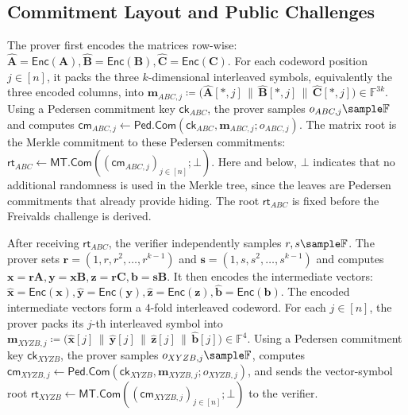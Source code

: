 \documentclass[conference,compsoc]{IEEEtran}
\newcommand{\cm}{\textsf{cm}}
\newcommand{\rt}{\textsf{rt}}
\newcommand{\merkleC}{\textsf{MT.Com}}
\newcommand{\ck}{\textsf{ck}}
\newcommand{\pedC}{\textsf{Ped.Com}}
\newcommand{\mat}{\mathbf}          %
\newcommand{\vect}{\mathbf}         %
\renewcommand{\enc}{\mathsf{Enc}}   %
\renewcommand{\ck}{{\textsf{ck}}}
\theoremstyle{plain}
\theoremstyle{definition}
\theoremstyle{remark}
\providecommand{\DIFaddtex}[1]{{\protect\color{DIFADD} \sf #1}} %
\providecommand{\DIFaddbegin}{} %
\providecommand{\DIFaddend}{} %
\providecommand{\DIFadd}[1]{\texorpdfstring{\DIFaddtex{#1}}{#1}} %
\providecommand{\DIFaddincludegraphics}[2][]{{\color{blue}\fbox{\DIFOincludegraphics[#1]{#2}}}} %
\DeclareRobustCommand{\DIFaddbegin}{\DIFOaddbegin \let\includegraphics\DIFaddincludegraphics} %
\DeclareRobustCommand{\DIFaddend}{\DIFOaddend \let\includegraphics\DIFOincludegraphics} %
\begin{document}
\subsection{Commitment Layout and Public Challenges}
\label{sec:commitment-challenge}

The prover first encodes the matrices row-wise:
{\footnotesize
\(\widehat{\mat{A}}=\enc(\mat{A}),
  \widehat{\mat{B}}=\enc(\mat{B}),
  \widehat{\mat{C}}=\enc(\mat{C})\).
}
For each codeword position \(j\in[n]\), it packs the three \(k\)-dimensional
interleaved symbols, equivalently the three encoded columns, into
{\footnotesize
\(\vect{m}_{ABC,j}
  \coloneqq
  \big(
    \widehat{\mat{A}}[*,j]\,
    \|\,\widehat{\mat{B}}[*,j]\,
    \|\,\widehat{\mat{C}}[*,j]
  \big)
  \in\mathbb{F}^{3k}\).
}
Using a Pedersen commitment key \(\ck_{ABC}\), the prover samples
\(o_{ABC,j}\sample\mathbb{F}\) and computes
{\footnotesize
\(\cm_{ABC,j}
  \gets
  \pedC(\ck_{ABC},\vect{m}_{ABC,j};o_{ABC,j})\).
}
The matrix root is the Merkle commitment to these Pedersen commitments:
{\footnotesize
\(\rt_{ABC}
  \gets
  \merkleC((\cm_{ABC,j})_{j\in[n]};\bot)\).
}
Here and below, \(\bot\) indicates that no additional randomness is used in the
Merkle tree, since the leaves are Pedersen commitments that already provide
hiding. The root \(\rt_{ABC}\) is fixed before the Freivalds challenge is
derived.

After receiving \(\rt_{ABC}\), the verifier  \DIFaddbegin \DIFadd{independently samples
\(r,s\sample\mathbb{F}\)}\DIFaddend .  The prover sets
{\footnotesize
\(\vect{r}=(1,r,r^2,\ldots,r^{k-1})\) \DIFaddbegin \DIFadd{and
\(\vect{s}=(1,s,s^2,\ldots,s^{k-1})\)}\DIFaddend }
and computes
{\footnotesize
 \DIFaddbegin \DIFadd{\(\vect{x}=\vect{r}\mat{A},
  \vect{y}=\vect{x}\mat{B},
  \vect{z}=\vect{r}\mat{C},
  \vect{b}=\vect{s}\mat{B}\)}\DIFaddend .
}
It then encodes the intermediate vectors:
{\footnotesize
 \DIFaddbegin \DIFadd{\(\widehat{\vect{x}}=\enc(\vect{x}),
  \widehat{\vect{y}}=\enc(\vect{y}),
  \widehat{\vect{z}}=\enc(\vect{z}),
  \widehat{\vect{b}}=\enc(\vect{b})\)}\DIFaddend .
}
The encoded intermediate vectors form a  \DIFaddbegin \DIFadd{\(4\)}\DIFaddend -fold interleaved codeword.  For
each \(j\in[n]\), the prover packs its \(j\)-th interleaved symbol into
{\footnotesize
 \DIFaddbegin \DIFadd{\(\vect{m}_{XYZB,j}
  \coloneqq
  \big(
    \widehat{\vect{x}}[j]\,
    \|\,\widehat{\vect{y}}[j]\,
    \|\,\widehat{\vect{z}}[j]\,
    \|\,\widehat{\vect{b}}[j]
  \big)
  \in\mathbb{F}^{4}\)}\DIFaddend .
}
Using a Pedersen commitment key  \DIFaddbegin \DIFadd{\(\ck_{XYZB}\)}\DIFaddend , the prover samples
 \DIFaddbegin \DIFadd{\(o_{XYZB,j}\sample\mathbb{F}\)}\DIFaddend , computes
{\footnotesize
 \DIFaddbegin \DIFadd{\(\cm_{XYZB,j}
  \gets
  \pedC(\ck_{XYZB},\vect{m}_{XYZB,j};o_{XYZB,j})\)}\DIFaddend ,
}
and sends the vector-symbol root
{\footnotesize
 \DIFaddbegin \DIFadd{\(\rt_{XYZB}
  \gets
  \merkleC((\cm_{XYZB,j})_{j\in[n]};\bot)\)
}\DIFaddend }
to the verifier.
\end{document}
